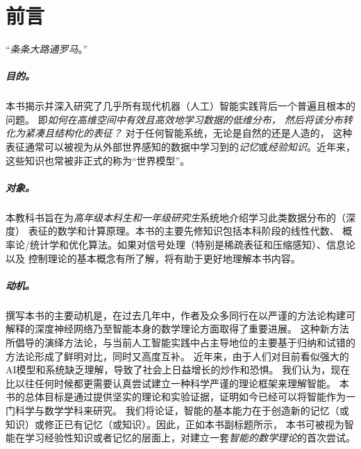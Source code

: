 \documentclass[../../book-main_zh.tex]{subfiles}
\begin{document}
\chapter*{前言}

\begin{center}
    ``{\em 条条大路通罗马}。''

\end{center}
\vspace{5mm}

\paragraph{目的。}
本书揭示并深入研究了几乎所有现代机器（人工）智能实践背后一个普遍且根本的问题。
即{\em 如何在高维空间中有效且高效地学习数据的低维分布，
    然后将该分布转化为紧凑且结构化的表征？} 对于任何智能系统，无论是自然的还是人造的，
这种表征通常可以被视为从外部世界感知的数据中学习到的{\em 记忆}或{\em 经验知识}。近年来，这些知识也常被非正式的称为“世界模型”。

\paragraph{对象。}
本教科书旨在为{\em 高年级本科生和一年级研究生}系统地介绍学习此类数据分布的（深度）
表征的数学和计算原理。本书的主要先修知识包括本科阶段的线性代数、
概率论/统计学和优化算法。如果对信号处理（特别是稀疏表征和压缩感知）、信息论以及
控制理论的基本概念有所了解，将有助于更好地理解本书内容。

\paragraph{动机。}
撰写本书的主要动机是，在过去几年中，作者及众多同行在以严谨的方法论构建可解释的深度神经网络乃至智能本身的数学理论方面取得了重要进展。
这种新方法所倡导的演绎方法论，与当前人工智能实践中占主导地位的主要基于归纳和试错的方法论形成了鲜明对比，同时又高度互补。
近年来，由于人们对目前看似强大的AI模型和系统缺乏理解，导致了社会上日益增长的炒作和恐惧。
我们认为，现在比以往任何时候都更需要认真尝试建立一种科学严谨的理论框架来理解智能。
本书的总体目标是通过提供坚实的理论和实验证据，证明如今已经可以将智能作为一门科学与数学学科来研究。
我们将论证，智能的基本能力在于创造新的记忆（或知识）或修正已有记忆（或知识）。因此，正如本书副标题所示，
本书可被视为智能在学习经验性知识或者记忆的层面上，对建立一套{\em 智能的数学理论}的首次尝试。
\end{document}
